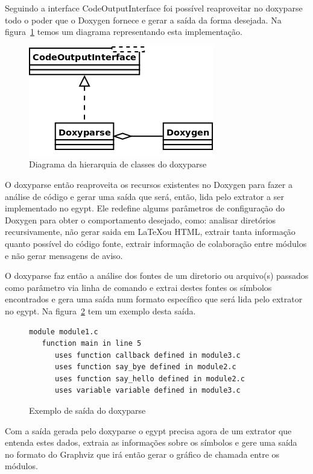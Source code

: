 Seguindo a interface CodeOutputInterface foi possível reaproveitar no doxyparse
todo o poder que o Doxygen fornece e gerar a saída da forma desejada. Na
figura~\ref{doxyparse-diagram} temos um diagrama representando esta
implementação.

\begin{figure}[h]
\center
\includegraphics[scale=0.4]{imagens/doxyparse-diagram}
\caption{Diagrama da hierarquia de classes do doxyparse}
\label{doxyparse-diagram}
\end{figure}

O doxyparse então reaproveita os recursos existentes no Doxygen para fazer a
análise de código e gerar uma saída que será, então, lida pelo extrator a ser
implementado no egypt. Ele redefine algums parâmetros de configuração do
Doxygen para obter o comportamento desejado, como: analisar diretórios
recursivamente, não gerar saida em \LaTeX ou HTML, extrair tanta informação
quanto possível do código fonte, extrair informação de colaboração entre
módulos e não gerar mensagens de aviso.

O doxyparse faz então a análise dos fontes de um diretorio ou arquivo(s)
passados como parâmetro via linha de comando e extrai destes fontes os símbolos
encontrados e gera uma saída num formato específico que será lida
pelo extrator no egypt. Na figura~\ref{exemplo-saida-doxyparse} tem um exemplo
desta saída.

\begin{figure}[h]
\begin{Verbatim}[frame=single,fontsize=\relsize{-2},fontfamily=courier]
module module1.c
   function main in line 5
      uses function callback defined in module3.c
      uses function say_bye defined in module2.c
      uses function say_hello defined in module2.c
      uses variable variable defined in module3.c
\end{Verbatim}
\caption{Exemplo de saída do doxyparse}
\label{exemplo-saida-doxyparse}
\end{figure}

Com a saída gerada pelo doxyparse o egypt precisa agora de um extrator que
entenda estes dados, extraia as informações sobre os símbolos e gere uma saída no
formato do Graphviz que irá então gerar o gráfico de chamada entre os módulos.

